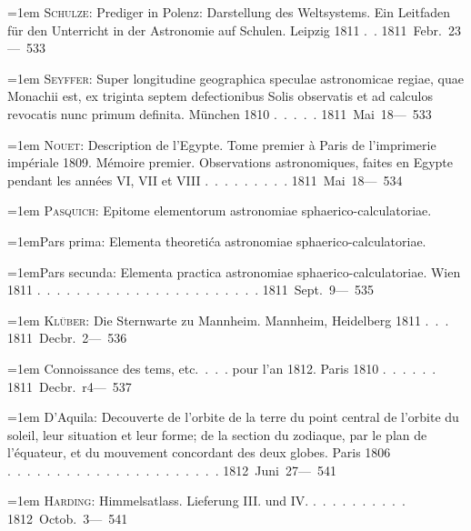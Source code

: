 \noindent\hangindent=1em \textsc{Schulze}: Prediger in Polenz: Darstellung des Weltsystems. Ein Leitfaden für den Unterricht in der Astronomie auf Schulen. Leipzig 1811 \mbox{.\ .} \hfill\mbox{1811 Febr. 23}\quad\mbox{--- 533}\par\smallskip
\noindent\hangindent=1em \textsc{Seyffer}: Super longitudine geographica speculae astronomicae regiae, quae Monachii est, ex triginta septem defectionibus Solis observatis et ad calculos revocatis nunc primum definita. München 1810 \mbox{.\ .\ .\ .\ .} \hfill\mbox{1811 Mai 18}\quad\mbox{--- 533}\par\smallskip
\noindent\hangindent=1em \textsc{Nouet}: Description de l'Egypte. Tome premier à Paris de l'imprimerie impériale 1809. Mémoire premier. Observations astronomiques, faites en Egypte pendant les années VI, VII et VIII \mbox{.\ .\ .\ .\ .\ .\ .\ .\ .} \hfill\mbox{1811 Mai 18}\quad\mbox{--- 534}\par\smallskip
\noindent\hangindent=1em \textsc{Pasquich}: Epitome elementorum astronomiae sphaerico-calculatoriae.\par\noindent\hangindent=1em\hspace{1em}Pars prima: Elementa theoretića astronomiae sphaerico-calculatoriae.\par\noindent\hangindent=1em\hspace{1em}Pars secunda: Elementa practica astronomiae sphaerico-calculatoriae. Wien 1811 \mbox{.\ .\ .\ .\ .\ .\ .\ .\ .\ .\ .\ .\ .\ .\ .\ .\ .\ .\ .\ .\ .\ .\ .} \hfill\mbox{1811 Sept. 9}\quad\mbox{--- 535}\par\smallskip
\noindent\hangindent=1em \textsc{Klüber}: Die Sternwarte zu Mannheim. Mannheim, Heidelberg 1811 \mbox{.\ .\ .} \hfill\mbox{1811 Decbr. 2}\quad\mbox{--- 536}\par\smallskip
\noindent\hangindent=1em Connoissance des tems, etc.\ .\ .\ . pour l'an 1812. Paris 1810 \mbox{.\ .\ .\ .\ .\ .} \hfill\mbox{1811 Decbr. r4}\quad\mbox{--- 537}\par\smallskip
\noindent\hangindent=1em D'Aquila: Decouverte de l'orbite de la terre du point central de l'orbite du soleil, leur situation et leur forme; de la section du zodiaque, par le plan de l'équateur, et du mouvement concordant des deux globes. Paris 1806 \mbox{.\ .\ .\ .\ .\ .\ .\ .\ .\ .\ .\ .\ .\ .\ .\ .\ .\ .\ .\ .\ .\ .} \hfill\mbox{1812 Juni 27}\quad\mbox{--- 541}\par\smallskip
\noindent\hangindent=1em \textsc{Harding}: Himmelsatlass. Lieferung III. und IV. \mbox{.\ .\ .\ .\ .\ .\ .\ .\ .\ .} \hfill\mbox{1812 Octob. 3}\quad\mbox{--- 541}\par\smallskip
